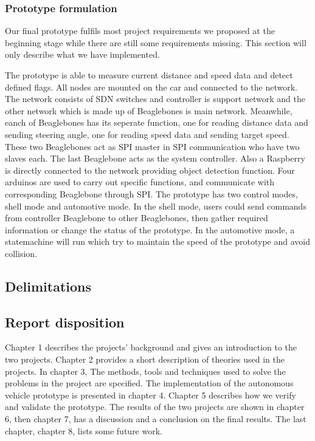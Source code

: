 \documentclass[11pt, titlepage]{article} %
\begin{document}
\subsubsection{Prototype formulation}
Our final prototype fulfils most project requirements we proposed at the beginning stage while there are still some requirements missing. This section will only describe what we have implemented.

The prototype is able to measure current distance and speed data and detect defined flags. All nodes are mounted on the car and connected to the network. The network consists of SDN switches and controller is support network and the other network which is made up of Beaglebones is main network. Meanwhile, eanch of Beaglebones has its seperate function, one for reading distance data and sending steering angle, one for reading speed data and sending target speed. These two Beaglebones act as SPI master in SPI communication who have two slaves each. The last Beaglebone acts as the system controller. Also a Raspberry is directly connected to the network providing object detection function. Four arduinos are used to carry out specific functions, and communicate with corresponding Beaglebone through SPI.
The prototype has two control modes, shell mode and automotive mode. In the shell mode, users could send commands from controller Beaglebone to other Beaglebones, then gather required information or change the status of the prototype. In the automotive mode, a statemachine will run which try to maintain the speed of the prototype and avoid collision. 


\subsection{Delimitations}

\subsection{Report disposition}
Chapter 1 describes the projects' background and gives an introduction to the two projects. Chapter 2 provides a short description of theories used in the projects. In chapter 3, The methods, tools and techniques used to solve the problems in the project are specified. The implementation of the autonomous vehicle prototype is presented in chapter 4. Chapter 5 describes how we verify and validate the prototype. The results of the two projects are shown in chapter 6, then chapter 7, has a discussion and a conclusion on the final results. The last chapter, chapter 8, lists some future work.  
\clearpage
\end{document}
